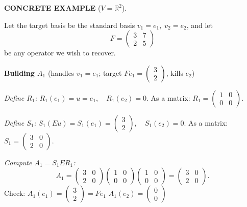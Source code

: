 \documentclass[12pt]{article}
\theoremstyle{mythmstyle}
\newenvironment{example}{%
  \vspace{8pt}
  \begin{mdframed}[backgroundcolor=examplebg, linecolor=exampleblue,
    linewidth=1.4pt, innerleftmargin=14pt, innerrightmargin=14pt,
    innertopmargin=12pt, innerbottommargin=12pt,
    skipabove=12pt, skipbelow=12pt]
  \noindent\textcolor{exampleblue}{\textbf{\small CONCRETE EXAMPLE} \normalsize($V = \mathbb{R}^2$).}\par\vspace{6pt}
}{%
  \end{mdframed}
  \vspace{6pt}
}
\begin{document}
\begin{example}
Let the target basis be the standard basis
$v_1 = e_1,\; v_2 = e_2$, and let
\[
  F = \begin{pmatrix}3&7\\2&5\end{pmatrix}
\]
be any operator we wish to recover.

\vspace{10pt}

\noindent\textbf{Building $A_1$} \quad (handles $v_1 = e_1$;
target $Fe_1 = \begin{pmatrix}3\\2\end{pmatrix}$, kills $e_2$)

\vspace{6pt}

\noindent\emph{Define $R_1$:} \quad
$R_1(e_1) = u = e_1,\quad R_1(e_2) = 0.$ \quad
As a matrix: $R_1 = \begin{pmatrix}1&0\\0&0\end{pmatrix}$.

\vspace{4pt}

\noindent\emph{Define $S_1$:} \quad
$S_1(Eu) = S_1(e_1) = \begin{pmatrix}3\\2\end{pmatrix},\quad S_1(e_2) = 0.$ \quad
As a matrix: $S_1 = \begin{pmatrix}3&0\\2&0\end{pmatrix}$.

\vspace{4pt}

\noindent\emph{Compute $A_1 = S_1 E R_1$:}
\[
    A_1 =
    \begin{pmatrix}3&0\\2&0\end{pmatrix}
    \begin{pmatrix}1&0\\0&0\end{pmatrix}
    \begin{pmatrix}1&0\\0&0\end{pmatrix}
    =
    \begin{pmatrix}3&0\\2&0\end{pmatrix}.
\]
\noindent Check: \;
$A_1(e_1) = \begin{pmatrix}3\\2\end{pmatrix} = Fe_1$ \checkmark \qquad
$A_1(e_2) = \begin{pmatrix}0\\0\end{pmatrix}$ \checkmark


\end{example}
\end{document}
